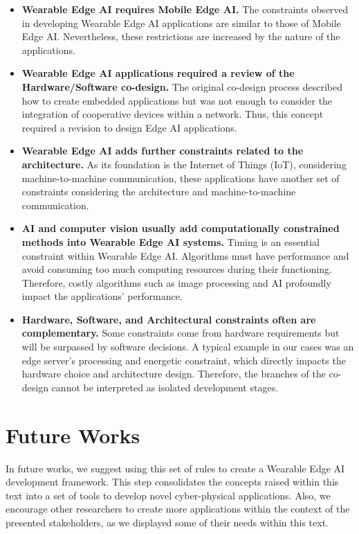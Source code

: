 \begin{itemize}
	\item \textbf{Wearable Edge AI requires Mobile Edge AI.} The constraints observed in developing Wearable Edge AI applications are similar to those of Mobile Edge AI. Nevertheless, these restrictions are increased by the nature of the applications.
	\item \textbf{Wearable Edge AI applications required a review of the Hardware/Software co-design.} The original co-design process described how to create embedded applications but was not enough to consider the integration of cooperative devices within a network. Thus, this concept required a revision to design Edge AI applications.
	\item \textbf{Wearable Edge AI adds further constraints related to the architecture.} As its foundation is the Internet of Things (IoT), considering machine-to-machine communication, these applications have another set of constraints considering the architecture and machine-to-machine communication.
	\item \textbf{AI and computer vision usually add computationally constrained methods into Wearable Edge AI systems.} Timing is an essential constraint within Wearable Edge AI. Algorithms must have performance and avoid consuming too much computing resources during their functioning. Therefore, costly algorithms such as image processing and AI profoundly impact the applications' performance. 
	\item \textbf{Hardware, Software, and Architectural constraints often are complementary.} Some constraints come from hardware requirements but will be surpassed by software decisions. A typical example in our cases was an edge server's processing and energetic constraint, which directly impacts the hardware choice and architecture design. Therefore, the branches of the co-design cannot be interpreted as isolated development stages.
\end{itemize}

\section{Future Works}

In future works, we suggest using this set of rules to create a Wearable Edge AI development framework. This step consolidates the concepts raised within this text into a set of tools to develop novel cyber-physical applications. Also, we encourage other researchers to create more applications within the context of the presented stakeholders, as we displayed some of their needs within this text.